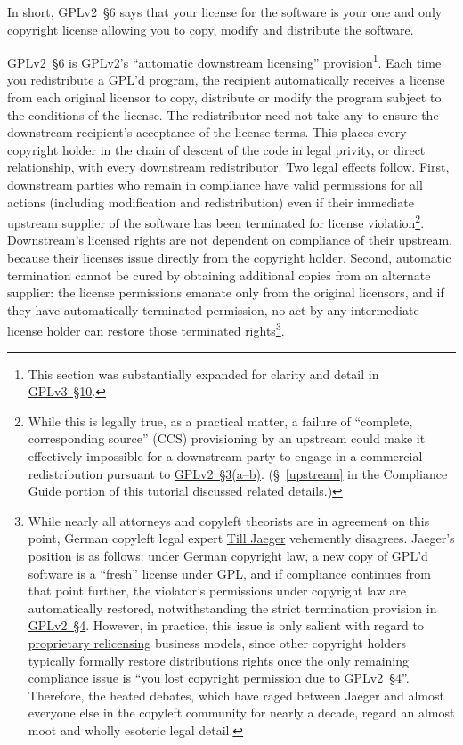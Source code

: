 In short, GPLv2~\S6 says that your license for the software is your one and
only copyright license allowing you to copy, modify and distribute the
software.

GPLv2~\S6 is GPLv2's ``automatic downstream licensing''
provision\footnote{This section was substantially expanded for clarity and
  detail in \hyperref[GPLv3s10]{GPLv3~\S10}.}.  Each time you
redistribute a GPL'd program, the recipient automatically receives a license
from each original licensor to copy, distribute or modify the program subject
to the conditions of the license.  The redistributor need not take any
to ensure the downstream recipient's acceptance of the license terms.
This places every copyright holder in the chain of descent of the code
in legal privity, or direct relationship, with every downstream
redistributor.  Two legal effects follow.  First, downstream parties
who remain in compliance have valid permissions for all actions
(including modification and redistribution) even if their immediate upstream
supplier of the software has been terminated for license
violation\footnote{\label{German-reinstatement-footnote} While this is legally true, as a practical matter, a
  failure of ``complete, corresponding source'' (CCS) provisioning by an
  upstream could make it effectively impossible for a downstream party to
  engage in a commercial redistribution pursuant to
  \hyperref[GPLv2s3]{GPLv2~\S3(a--b)}.  (\S~\ref{upstream} in the Compliance
  Guide portion of this tutorial discussed related details.)}.
Downstream's
licensed rights are not dependent on compliance of their upstream, because
their licenses issue directly from the copyright holder.  Second, automatic
termination cannot be cured by obtaining additional copies from an alternate
supplier: the license permissions emanate only from the original licensors,
and if they have automatically terminated permission, no act by any
intermediate license holder can restore those terminated
rights\footnote{While nearly all attorneys and copyleft theorists are in
  agreement on this point, German copyleft legal expert
  \href{http://www.jbb.de/en/attorneys/till-jaeger/}{Till Jaeger}
  vehemently disagrees.  Jaeger's position is as follows: under German
  copyright law, a new copy of GPL'd software is a ``fresh'' license under
  GPL, and if compliance continues from that point further, the violator's
  permissions under copyright law are automatically restored, notwithstanding
  the strict termination provision in \hyperref[GPLv2s4]{GPLv2~\S4}.
  However, in
  practice, this issue is only salient with regard to \hyperref[Proprietary
    Relicensing]{proprietary relicensing} business models, since other copyright
  holders typically formally restore distributions rights once the only
  remaining compliance issue is ``you lost copyright permission due to
  GPLv2~\S4''.  Therefore, the heated debates, which have raged between
  Jaeger and almost everyone else in the copyleft community for nearly a
  decade, regard an almost moot and wholly esoteric legal detail.}.

